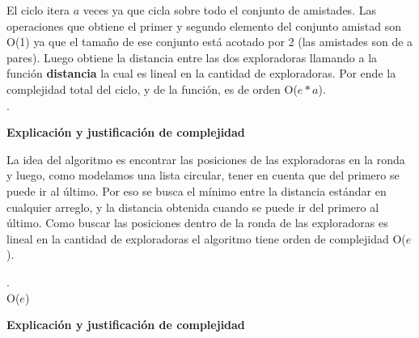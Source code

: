 \documentclass[spanish,a4paper]{article}
\begin{document}
El ciclo itera $a$ veces ya que cicla sobre todo el conjunto de amistades. Las operaciones que obtiene el 
primer y segundo elemento del conjunto amistad son O(1) ya que el tamaño de ese conjunto está acotado por 
2 (las amistades son de a pares). Luego obtiene la distancia entre las dos exploradoras llamando a la 
función \textbf{distancia} la cual es lineal en la cantidad de exploradoras. Por ende la complejidad
total del ciclo, y de la función, es de orden O($e*a$). \\
\noindent\makebox[\linewidth]{\rule{17cm}{0.4pt}}
.
\\

\begin{center}
\textbf{Explicación y justificación de complejidad} \\ 
\end{center} 

La idea del algoritmo es encontrar las posiciones de las exploradoras en la ronda y luego, como modelamos 
una lista circular, tener en cuenta que del primero se puede ir al último. Por eso se busca el mínimo entre
la distancia estándar en cualquier arreglo, y la distancia obtenida cuando se puede ir del primero al último.
Como buscar las posiciones dentro de la ronda de las exploradoras es lineal en la cantidad de exploradoras 
el algoritmo tiene orden de complejidad O($e$).

\noindent\makebox[\linewidth]{\rule{17cm}{0.4pt}}
.\\
 {O($e$)}

\vspace{3mm}
\begin{center}
\textbf{Explicación y justificación de complejidad} \\ 
\end{center} 
\end{document}
